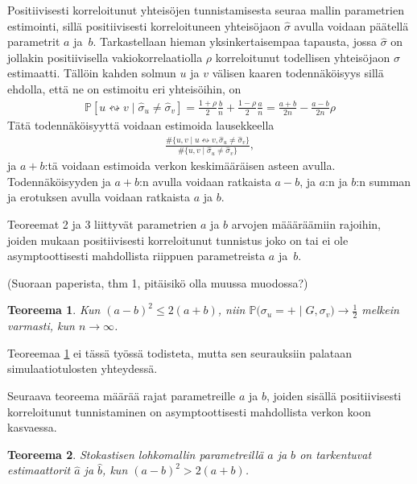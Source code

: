 \documentclass[finnish,12pt,a4paper,pdftex,sci,utf8]{aaltothesis}
\newtheorem{teoreema}{Teoreema}
\begin{document}
Positiivisesti korreloitunut yhteisöjen tunnistamisesta seuraa mallin parametrien estimointi, sillä positiivisesti korreloituneen yhteisöjaon $\hat{\sigma}$ avulla voidaan päätellä parametrit $a$ ja $b$. Tarkastellaan hieman yksinkertaisempaa tapausta, jossa $\hat{\sigma}$ on jollakin positiivisella vakiokorrelaatiolla $\rho$ korreloitunut todellisen yhteisöjaon $\sigma$ estimaatti. Tällöin kahden solmun $u$ ja $v$ välisen kaaren todennäköisyys sillä ehdolla, että ne on estimoitu eri yhteisöihin, on
\begin{align*}
	\mathbb{P}[u \leftrightsquigarrow v \mid \hat{\sigma}_{u} \neq \hat{\sigma}_{v}] = \frac{1+\rho}{2} \frac{b}{n} + \frac{1-\rho}{2} \frac{a}{n} = \frac{a+b}{2n} - \frac{a-b}{2n} \rho
\end{align*}
Tätä todennäköisyyttä voidaan estimoida lausekkeella
\begin{align*}
	\frac{ \# \{ u,v \mid u \leftrightsquigarrow v, \hat{\sigma}_{u} \neq \hat{\sigma}_{v} \} }{ \# \{ u,v \mid \hat{\sigma}_{u} \neq \hat{\sigma}_{v} \} },
\end{align*}
ja $a+b$:tä voidaan estimoida verkon keskimääräisen asteen avulla. Todennäköisyyden ja $a+b$:n avulla voidaan ratkaista $a-b$, ja $a$:n ja $b$:n summan ja erotuksen avulla voidaan ratkaista $a$ ja $b$.

Teoreemat 2 ja 3 liittyvät parametrien $a$ ja $b$ arvojen määäräämiin rajoihin, joiden mukaan positiivisesti korreloitunut tunnistus joko on tai ei ole asymptoottisesti mahdollista riippuen parametreista $a$ ja $b$.

(Suoraan paperista, thm 1, pitäisikö olla muussa muodossa?)
\begin{teoreema}
	\label{teoreema:mahdottomuus}
	Kun $(a-b)^2 \leq 2(a+b)$, niin $\mathbb{P}\big( \sigma_u = + \mid G, \sigma_v \big) \rightarrow \frac{1}{2}$ melkein varmasti, kun $n \rightarrow \infty$. 
\end{teoreema}

Teoreemaa \ref{teoreema:mahdottomuus} ei tässä työssä todisteta, mutta sen seurauksiin palataan simulaatiotulosten yhteydessä.

Seuraava teoreema määrää rajat parametreille $a$ ja $b$, joiden sisällä positiivisesti korreloitunut tunnistaminen on asymptoottisesti mahdollista verkon koon kasvaessa.
\begin{teoreema}
	\label{teoreema:tarkentuvatest}
	Stokastisen lohkomallin parametreillä $a$ ja $b$ on tarkentuvat estimaattorit $\hat{a}$ ja $\hat{b}$, kun $(a-b)^{2} > 2(a+b)$.
\end{teoreema}
\end{document}
